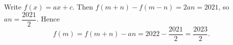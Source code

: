 Write $f(x)=ax+c$. Then $f(m+n)-f(m-n)=2an=2021$, so $an=\dfrac{2021}2$. Hence
\[f(m)=f(m+n)-an=2022-\dfrac{2021}{2}=\boxed{\dfrac{2023}{2}}.\]
